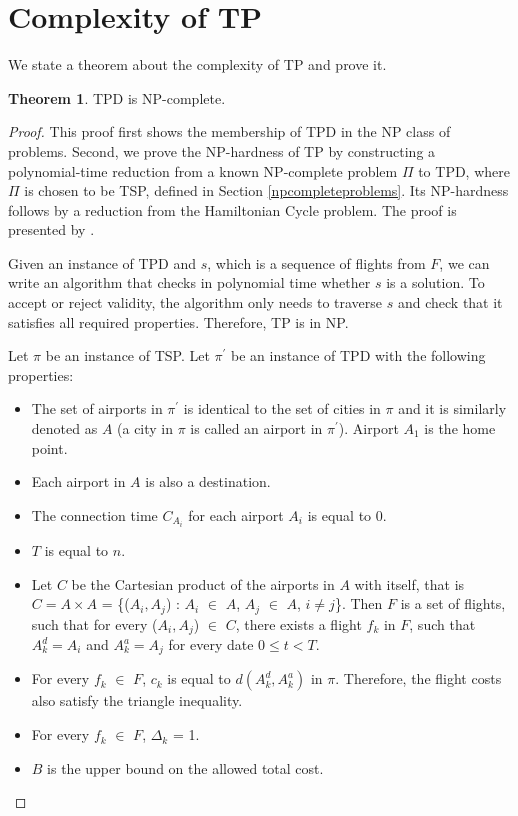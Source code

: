 \documentclass{mprop}
\theoremstyle{definition}
\newtheorem{theorem}{Theorem}
\begin{document}
\section{Complexity of TP}
We state a theorem about the complexity of TP and prove it.
\begin{theorem}
TPD is NP-complete.
\end{theorem}

\begin{proof}
\label{npcompleteproof}
This proof first shows the membership of TPD in the NP class of problems. Second, we prove the NP-hardness of TP by constructing a polynomial-time reduction from a known NP-complete problem $\Pi$ to TPD, where $\Pi$ is chosen to be TSP, defined in Section \ref{npcompleteproblems}. Its NP-hardness follows by a reduction from the Hamiltonian Cycle problem. The proof is presented by \citet{thebible}.

Given an instance of TPD and $s$, which is a sequence of flights from $F$, we can write an algorithm that checks in polynomial time whether $s$ is a solution. To accept or reject validity, the algorithm only needs to traverse $s$ and check that it satisfies all required properties. Therefore, TP is in NP.

Let $\pi$ be an instance of TSP. Let $\pi^{\prime}$ be an instance of TPD with the following properties:
\begin{itemize}
\item The set of airports in $\pi^{\prime}$ is identical to the set of cities in $\pi$ and it is similarly denoted as $A$ (a city in $\pi$ is called an airport in $\pi^{\prime}$). Airport $A_{1}$ is the home point.
\item Each airport in $A$ is also a destination.
\item The connection time $C_{A_{i}}$ for each airport $A_{i}$ is equal to 0.
\item $T$ is equal to $n$.
\item Let $C$ be the Cartesian product of the airports in $A$ with itself, that is $C = A \times A$ = \{($A_{i}, A_{j}$) : $A_{i}$ $\in$ $A$, $A_{j}$ $\in$ $A$, $i \neq j$\}. Then $F$ is a set of flights, such that for every ($A_{i}, A_{j}$) $\in$ $C$, there exists a flight $f_{k}$ in $F$, such that $A^{d}_{k} = A_{i}$ and $A^{a}_{k} = A_{j}$ for every date $0 \leq t < T$.
\item For every $f_{k}$ $\in$ $F$, $c_{k}$ is equal to $d(A^{d}_{k}, A^{a}_{k})$ in $\pi$. Therefore, the flight costs also satisfy the triangle inequality.
\item For every $f_{k}$ $\in$ $F$, $\Delta_{k}$ = 1.
\item $B$ is the upper bound on the allowed total cost.
\end{itemize}


\end{proof}
\end{document}
